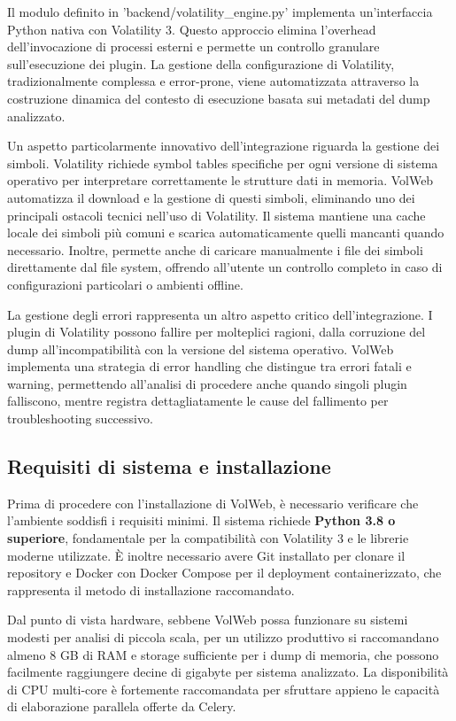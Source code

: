 Il modulo definito in 'backend/volatility\_engine.py' implementa un'interfaccia Python nativa con Volatility 3. Questo approccio elimina l'overhead dell'invocazione di processi esterni e permette un controllo granulare sull'esecuzione dei plugin. La gestione della configurazione di Volatility, tradizionalmente complessa e error-prone, viene automatizzata attraverso la costruzione dinamica del contesto di esecuzione basata sui metadati del dump analizzato.

Un aspetto particolarmente innovativo dell'integrazione riguarda la gestione dei simboli. Volatility richiede symbol tables specifiche per ogni versione di sistema operativo per interpretare correttamente le strutture dati in memoria. VolWeb automatizza il download e la gestione di questi simboli, eliminando uno dei principali ostacoli tecnici nell'uso di Volatility. Il sistema mantiene una cache locale dei simboli più comuni e scarica automaticamente quelli mancanti quando necessario. Inoltre, permette anche di caricare manualmente i file dei simboli direttamente dal file system, offrendo all'utente un controllo completo in caso di configurazioni particolari o ambienti offline.

La gestione degli errori rappresenta un altro aspetto critico dell'integrazione. I plugin di Volatility possono fallire per molteplici ragioni, dalla corruzione del dump all'incompatibilità con la versione del sistema operativo. VolWeb implementa una strategia di error handling che distingue tra errori fatali e warning, permettendo all'analisi di procedere anche quando singoli plugin falliscono, mentre registra dettagliatamente le cause del fallimento per troubleshooting successivo.

\subsection{Requisiti di sistema e installazione}

Prima di procedere con l'installazione di VolWeb, è necessario verificare che l'ambiente soddisfi i requisiti minimi. Il sistema richiede \textbf{Python 3.8 o superiore}, fondamentale per la compatibilità con Volatility 3 e le librerie moderne utilizzate. È inoltre necessario avere Git installato per clonare il repository e Docker con Docker Compose per il deployment containerizzato, che rappresenta il metodo di installazione raccomandato.

Dal punto di vista hardware, sebbene VolWeb possa funzionare su sistemi modesti per analisi di piccola scala, per un utilizzo produttivo si raccomandano almeno 8 GB di RAM e storage sufficiente per i dump di memoria, che possono facilmente raggiungere decine di gigabyte per sistema analizzato. La disponibilità di CPU multi-core è fortemente raccomandata per sfruttare appieno le capacità di elaborazione parallela offerte da Celery.

